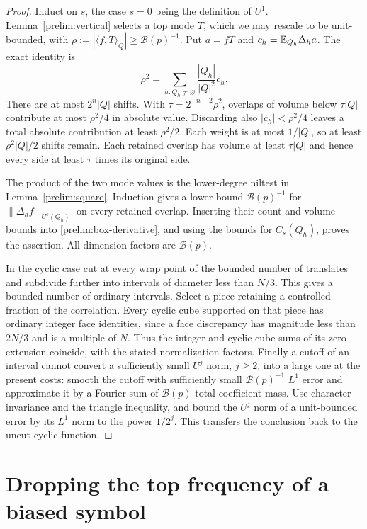 \begin{proof}
Induct on $s$, the case $s=0$ being the definition of $U^1$.
Lemma~\ref{prelim:vertical} selects a top mode $T$, which we may
rescale to be unit-bounded, with
$\rho:=|\langle f,T\rangle_Q|\geq\mathcal B(p)^{-1}$.
Put $a=f\overline T$ and
$c_h=\mathbb E_{Q_h}\Delta_ha$.  The exact identity is
\begin{equation}\label{prelim:mean-square}
 \rho^2=\sum_{h:Q_h\ne\varnothing}
               \frac{|Q_h|}{|Q|^2}c_h.
\end{equation}
There are at most $2^n|Q|$ shifts.  With
$\tau=2^{-n-2}\rho^2$, overlaps of volume below $\tau|Q|$
contribute at most $\rho^2/4$ in absolute value.  Discarding also
$|c_h|<\rho^2/4$ leaves a total absolute contribution at least
$\rho^2/2$.  Each weight is at most $1/|Q|$, so at least
$\rho^2|Q|/2$ shifts remain.  Each retained overlap has volume
at least $\tau|Q|$ and hence every side at least $\tau$ times
its original side.

The product of the two mode values is the lower-degree niltest
in Lemma~\ref{prelim:square}.  Induction gives a lower bound
$\mathcal B(p)^{-1}$ for $\|\Delta_hf\|_{U^s(Q_h)}$ on every
retained overlap.  Inserting their count and volume bounds into
\eqref{prelim:box-derivative}, and using the bounds for $C_s(Q_h)$,
proves the assertion.  All dimension factors are $\mathcal B(p)$.

In the cyclic case cut at every wrap point of the bounded number of
translates and subdivide further into intervals of diameter less
than $N/3$.  This gives a bounded number of ordinary intervals.
Select a piece retaining a controlled fraction of the correlation.
Every cyclic cube supported on that piece has ordinary integer
face identities, since a face discrepancy has magnitude less
than $2N/3$ and is a multiple of $N$.  Thus the integer and
cyclic cube sums of its zero extension coincide, with the stated
normalization factors.
Finally a cutoff of an interval cannot convert a sufficiently small
$U^j$ norm, $j\geq2$, into a large one at the present costs: smooth
the cutoff with sufficiently small $\mathcal B(p)^{-1}$ $L^1$
error and approximate it by
a Fourier sum of $\mathcal B(p)$ total coefficient mass.  Use
character invariance and the triangle inequality, and bound the
$U^j$ norm of a unit-bounded error by its $L^1$ norm to the power
$1/2^j$.  This transfers the conclusion back to the uncut cyclic
function.
\end{proof}

\section{Dropping the top frequency of a biased symbol}
\label{prelim:step-drop-section}

